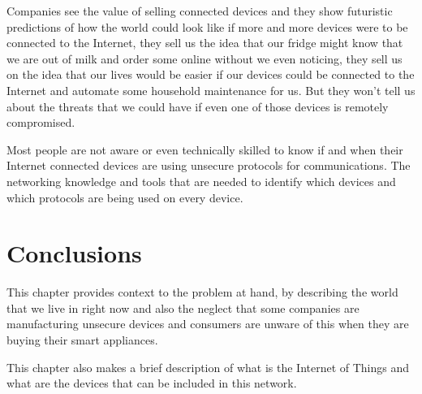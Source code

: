 Companies see the value of selling connected devices and they show futuristic
predictions of how the world could look like if more and more devices were to
be connected to the Internet, they sell us the idea that our fridge might know
that we are out of milk and order some online without we even noticing, they
sell us on the idea that our lives would be easier if our devices could be
connected to the Internet and automate some household maintenance for us. But
they won't tell us about the threats that we could have if even one of those
devices is remotely compromised.

Most people are not aware or even technically skilled to know if and when their
Internet connected devices are using unsecure protocols for communications. The
networking knowledge and tools that are needed to identify which devices and
which protocols are being used on every device.

\section{Conclusions}
\label{chap2:sec:concs}
This chapter provides context to the problem at hand, by describing the world
that we live in right now and also the neglect that some companies are
manufacturing unsecure devices and consumers are unware of this when they are
buying their smart appliances.

This chapter also makes a brief description of what is the Internet of Things
and what are the devices that can be included in this network.
